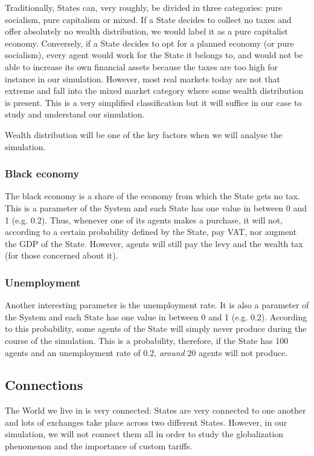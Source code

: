         Traditionally, States can, very roughly, be divided in three categories: pure socialism, pure capitalism or mixed. If a State decides to collect no taxes and offer absolutely no wealth distribution, we would label it as a pure capitalist economy. Conversely, if a State decides to opt for a planned economy (or pure socialism), every agent would work for the State it belongs to, and would not be able to increase its own financial assets because the taxes are too high for instance in our simulation.
        However, most real markets today are not that extreme and fall into the mixed market category where some wealth distribution is present. This is a very simplified classification but it will suffice in our case to study and understand our simulation.

        Wealth distribution will be one of the key factors when we will analyse the simulation.


    \subsubsection{Black economy}
    The black economy is a share of the economy from which the State gets no tax. This is a parameter of the System and each State has one value in between 0 and 1 (e.g. 0.2). Thus, whenever one of its agents makes a purchase, it will not, according to a certain probability defined by the State, pay VAT, nor augment the GDP of the State. However, agents will still pay the levy and the wealth tax (for those concerned about it).

    \subsubsection{Unemployment}
    Another interesting parameter is the unemployment rate. It is also a parameter of the System and each State has one value in between 0 and 1 (e.g. 0.2). According to this probability, some agents of the State will simply never produce during the course of the simulation. This is a probability, therefore, if the State has 100 agents and an unemployment rate of 0.2, \emph{around} 20 agents will not produce.



\subsection{Connections}\label{section:connections}
    The World we live in is very connected: States are very connected to one another and lots of exchanges take place across two different States. However, in our simulation, we will not connect them all in order to study the globalization phenomenon and the importance of custom tariffs. 

